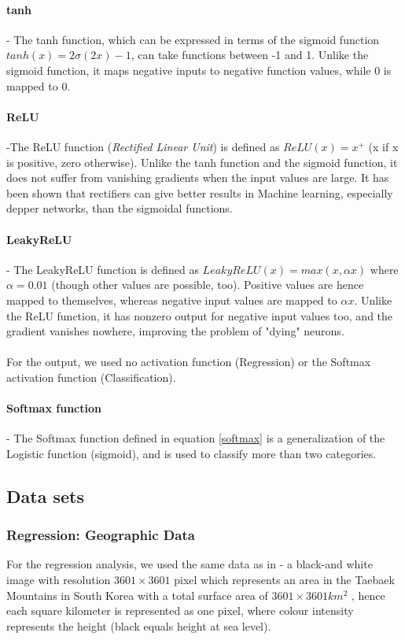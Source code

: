 \documentclass[11pt,a4paper,titlepage]{article}
\begin{document}
\paragraph*{tanh} - The tanh function, which can be expressed in terms of the sigmoid function $tanh(x)=2\sigma(2x)-1$, can take functions between -1 and 1. Unlike the sigmoid function, it maps negative inputs to negative function values, while 0 is mapped to 0.
\paragraph*{ReLU} -The ReLU function (\textit{Rectified Linear Unit}) is defined as $ReLU(x)=x^+$ (x if x is positive, zero otherwise). Unlike the tanh function and the sigmoid function, it does not suffer from vanishing gradients when the input values are large. It has been shown \citep{surpremeRELU} that rectifiers can give better results in Machine learning, especially depper networks, than the sigmoidal functions.
\paragraph*{LeakyReLU} - The LeakyReLU function is defined as $LeakyReLU(x)=max(x,\alpha x)$ where $\alpha=0.01$ (though other values are possible, too). Positive values are hence mapped to themselves, whereas negative input values are mapped to $\alpha x$. Unlike the ReLU function, it has nonzero output for negative input values too, and the gradient vanishes nowhere, improving the problem of "dying" neurons.\\\\
For the output, we used no activation function (Regression) or the Softmax activation function (Classification). 
\paragraph*{Softmax function} - The Softmax function defined in equation \eqref{softmax} is a generalization of the Logistic function (sigmoid), and is used to classify more than two categories.
\subsection{Data sets}
\subsubsection{Regression: Geographic Data}
For the regression analysis, we used the same data as in \citep{Project1} - a black-and white image with resolution $3601 \times 3601$ pixel which represents an area in the Taebaek Mountains in South Korea with a total surface area of $3601 \times 3601km^2$ , hence each square kilometer is represented as one pixel, where colour intensity represents the height (black equals height at sea level).
\end{document}
